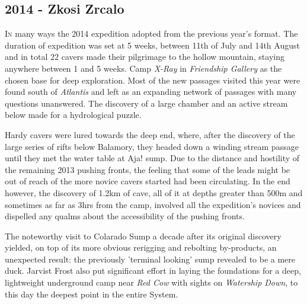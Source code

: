 \newpage
\begin{tcolorbox}
	


\chapter{2014 - Zkosi Zrcalo}
		\lettrine{I}{n} many ways the 2014 expedition adopted from the previous year's format. The duration of expedition was set at 5 weeks, between 11th of July and 14th August and in total 22 cavers made their pilgrimage to the hollow mountain, staying anywhere between 1 and 5 weeks. Camp \emph{X-Ray} in \emph{Friendship Gallery} as the chosen base for deep exploration. Most of the new passages visited this year were found south of \emph{Atlantis} and left as an expanding network of passages with many questions unanswered. The discovery of a large chamber and an active stream below made for a hydrological puzzle. 

		Hardy cavers were lured towards the deep end, where, after the discovery of the large series of rifts below Balamory, they headed down a winding stream passage until they met the water table at Aja! sump.  Due to the distance and hostility of the remaining 2013 pushing fronts, the feeling that some of the leads might be out of reach of the more novice cavers started had been circulating. In the end however, the discovery of 1.2km of cave, all of it at depths greater than 500m and sometimes as far as 3hrs from the camp, involved all the expedition's novices and dispelled any qualms about the accessibility of the pushing fronts.

 		The noteworthy visit to Colarado Sump a decade after its original discovery yielded, on top of its more obvious rerigging and rebolting by-products, an unexpected result: the previously 'terminal looking' sump revealed to be a mere duck. Jarvist Frost also put significant effort in laying the foundations for a deep, lightweight underground camp near \emph{Red Cow} with sights on \emph{Watership Down}, to this day the deepest point in the entire System.
		
		
\end{tcolorbox}
